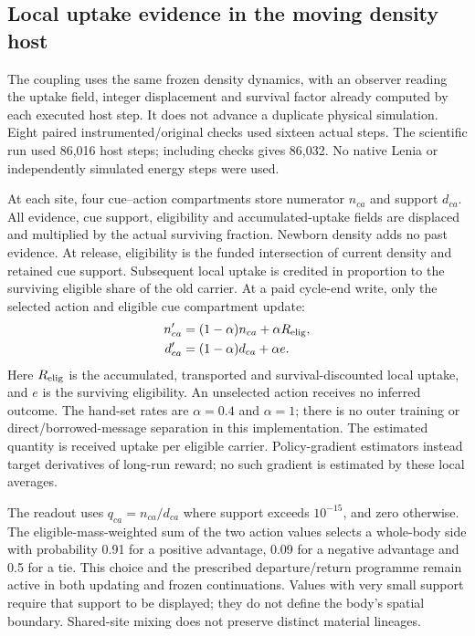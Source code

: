 \subsection*{Local uptake evidence in the moving density host}
The coupling uses the same frozen density dynamics, with an observer reading the uptake field, integer displacement and survival factor already computed by each executed host step. It does not advance a duplicate physical simulation. Eight paired instrumented/original checks used sixteen actual steps. The scientific run used 86,016 host steps; including checks gives 86,032. No native Lenia or independently simulated energy steps were used.

At each site, four cue--action compartments store numerator $n_{ca}$ and support $d_{ca}$. All evidence, cue support, eligibility and accumulated-uptake fields are displaced and multiplied by the actual surviving fraction. Newborn density adds no past evidence. At release, eligibility is the funded intersection of current density and retained cue support. Subsequent local uptake is credited in proportion to the surviving eligible share of the old carrier. At a paid cycle-end write, only the selected action and eligible cue compartment update:
\begin{align}
n_{ca}'&=(1-\alpha)n_{ca}+\alpha R_{\rm elig},\\
d_{ca}'&=(1-\alpha)d_{ca}+\alpha e.
\end{align}
Here $R_{\rm elig}$ is the accumulated, transported and survival-discounted local uptake, and $e$ is the surviving eligibility. An unselected action receives no inferred outcome. The hand-set rates are $\alpha=0.4$ and $\alpha=1$; there is no outer training or direct/borrowed-message separation in this implementation. The estimated quantity is received uptake per eligible carrier. Policy-gradient estimators instead target derivatives of long-run reward\cite{baxter}; no such gradient is estimated by these local averages.

The readout uses $q_{ca}=n_{ca}/d_{ca}$ where support exceeds $10^{-15}$, and zero otherwise. The eligible-mass-weighted sum of the two action values selects a whole-body side with probability 0.91 for a positive advantage, 0.09 for a negative advantage and 0.5 for a tie. This choice and the prescribed departure/return programme remain active in both updating and frozen continuations. Values with very small support require that support to be displayed; they do not define the body's spatial boundary. Shared-site mixing does not preserve distinct material lineages.

